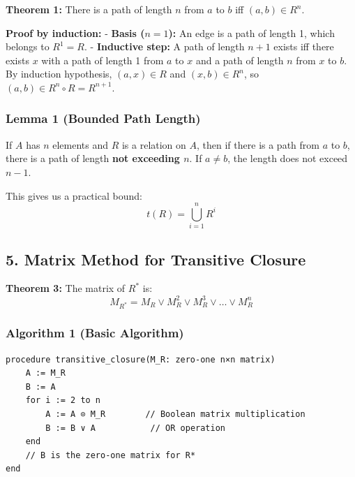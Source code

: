 \documentclass[10pt,a4paper,openany]{ctexbook}
\theoremstyle{definition}
\theoremstyle{remark}
\renewenvironment{quote}
  {\list{}{\leftmargin=1em\rightmargin=0pt\topsep=0.5pt\partopsep=0pt}\item[]}
  {\endlist}
\begin{document}
\begin{quote}
\textbf{Theorem 1:} There is a path of length $n$ from $a$ to $b$ iff $(a,b) \in R^n$.

\textbf{Proof by induction:}
- \textbf{Basis ($n=1$):} An edge is a path of length 1, which belongs to $R^1 = R$.
- \textbf{Inductive step:} A path of length $n+1$ exists iff there exists $x$ with a path of length 1 from $a$ to $x$ and a path of length $n$ from $x$ to $b$. By induction hypothesis, $(a,x) \in R$ and $(x,b) \in R^n$, so $(a,b) \in R^n \circ R = R^{n+1}$.

\end{quote}

\subsubsection{Lemma 1 (Bounded Path Length)}

\begin{quote}
If $A$ has $n$ elements and $R$ is a relation on $A$, then if there is a path from $a$ to $b$, there is a path of length \textbf{not exceeding $n$}. If $a \neq b$, the length does not exceed $n-1$.

This gives us a practical bound:
\[
t(R) = \bigcup_{i=1}^{n} R^i
\]


\end{quote}
\vspace{-2pt}

\subsection{5. Matrix Method for Transitive Closure}

\begin{quote}
\textbf{Theorem 3:} The matrix of $R^*$ is:
\[
M_{R^*} = M_R \lor M_R^2 \lor M_R^3 \lor \dots \lor M_R^n
\]


\end{quote}

\subsubsection{Algorithm 1 (Basic Algorithm)}

{\footnotesize\begin{verbatim}
procedure transitive_closure(M_R: zero-one n×n matrix)
    A := M_R
    B := A
    for i := 2 to n
        A := A ⊙ M_R        // Boolean matrix multiplication
        B := B ∨ A           // OR operation
    end
    // B is the zero-one matrix for R*
end
\end{verbatim}}
\end{document}
